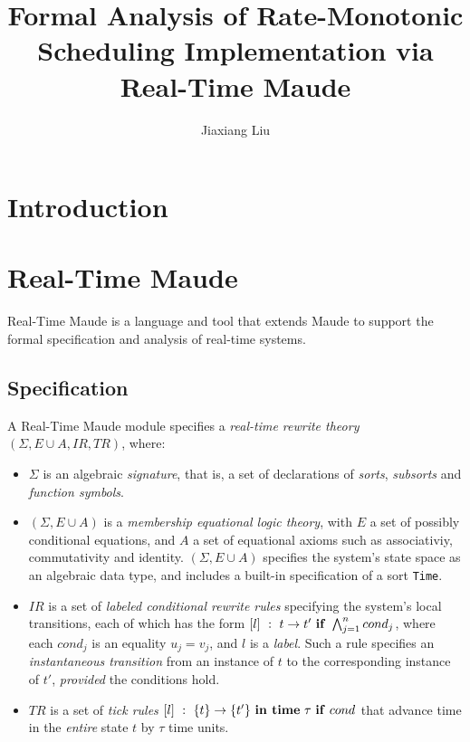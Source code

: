 \documentclass{llncs}
\begin{document}

\title{Formal Analysis of Rate-Monotonic Scheduling Implementation via Real-Time Maude}
\author{Jiaxiang Liu}
\maketitle
\thispagestyle{empty}

\section{Introduction}

\section{Real-Time Maude}
Real-Time Maude is a language and tool that extends Maude to support
the formal specification and analysis of real-time systems.

\subsection{Specification}
A Real-Time Maude module specifies a \emph{real-time rewrite theory}
$(\Sigma, E\cup A , IR, TR)$, where:
\begin{itemize}
\item $\Sigma$ is an algebraic \emph{signature}, that is, a set of
  declarations of \emph{sorts}, \emph{subsorts} and \emph{function
    symbols}.
\item $(\Sigma, E\cup A)$ is a \emph{membership equational logic
  theory}, with $E$ a set of possibly conditional equations, and $A$ a
  set of equational axioms such as associativiy, commutativity and
  identity.  $(\Sigma, E\cup A)$ specifies the system's state space as
  an algebraic data type, and includes a built-in specification of a
  sort \verb|Time|.
\item $IR$ is a set of \emph{labeled conditional rewrite rules}
  specifying the system's local transitions, each of which has the
  form $[l]~:~t\rightarrow t'\mbox{ \textbf{if}
  }\bigwedge^n_{j=1}cond_j$, where each $cond_j$ is an equality
  $u_j=v_j$, and $l$ is a \emph{label}. Such a rule specifies an
  \emph{instantaneous transition} from an instance of $t$ to the
  corresponding instance of $t'$, \emph{provided} the conditions hold.
\item $TR$ is a set of \emph{tick rules} $[l]~:~\{t\}\rightarrow\{t'\}
  \mbox{ \textbf{in time} }\tau\mbox{ \textbf{if} }cond$ that advance
  time in the \emph{entire} state $t$ by $\tau$ time units.
\end{itemize}
\end{document}
